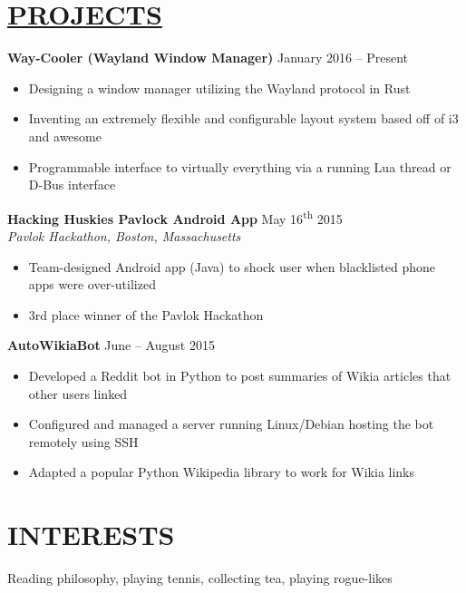 \documentclass[overlapped,line]{res}
\begin{document}
\begin{resume}
\section{\underline{PROJECTS}}
				\textbf{Way-Cooler (Wayland Window Manager)} \hfill January 2016 \--- Present
				\begin{itemize}  \itemsep -2pt
				\item Designing a window manager utilizing the Wayland protocol in Rust
				\item Inventing an extremely flexible and configurable layout system based off of i3 and awesome
				\item Programmable interface to virtually everything via a running Lua thread or D-Bus interface
				\end{itemize}

                \textbf{Hacking Huskies Pavlock Android App} \hfill            May 16\textsuperscript{th} 2015\\
                {\sl Pavlok Hackathon, Boston, Massachusetts}
                 \begin{itemize}  \itemsep -2pt
                 \item Team-designed Android app (Java) to shock user when blacklisted phone apps were over-utilized
                 \item 3rd place winner of the Pavlok Hackathon
                 \end{itemize} 

                  \textbf{AutoWikiaBot} \hfill            June \--- August 2015
                  \begin{itemize}  \itemsep -2pt
                  \item Developed a Reddit bot in Python to post summaries of Wikia articles that other users linked
                  \item Configured and managed a server running Linux/Debian hosting the bot remotely using SSH
                  \item Adapted a popular Python Wikipedia library to work for Wikia links
                  \end{itemize}

\noindent\makebox[6.5in]{\rule{6.5in}{0.4pt}}

\section{INTERESTS} Reading philosophy, playing tennis, collecting tea, playing rogue-likes

\end{resume}
\end{document}
